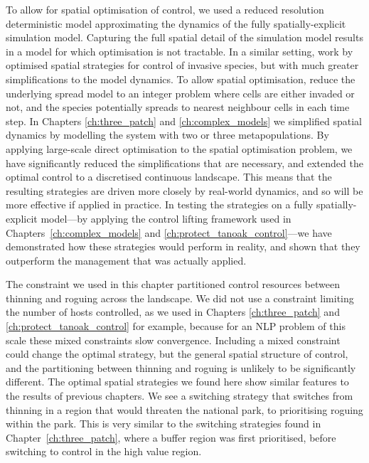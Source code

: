 To allow for spatial optimisation of control, we used a reduced resolution deterministic model approximating the dynamics of the fully spatially-explicit simulation model. Capturing the full spatial detail of the simulation model results in a model for which optimisation is not tractable. In a similar setting, work by \citet{epanchin_optimal_2012} optimised spatial strategies for control of invasive species, but with much greater simplifications to the model dynamics. To allow spatial optimisation, \citet{epanchin_optimal_2012} reduce the underlying spread model to an integer problem where cells are either invaded or not, and the species potentially spreads to nearest neighbour cells in each time step. In Chapters \ref{ch:three_patch} and \ref{ch:complex_models} we simplified spatial dynamics by modelling the system with two or three metapopulations. By applying large-scale direct optimisation to the spatial optimisation problem, we have significantly reduced the simplifications that are necessary, and extended the optimal control to a discretised continuous landscape. This means that the resulting strategies are driven more closely by real-world dynamics, and so will be more effective if applied in practice. In testing the strategies on a fully spatially-explicit model---by applying the control lifting framework used in Chapters~\ref{ch:complex_models} and \ref{ch:protect_tanoak_control}---we have demonstrated how these strategies would perform in reality, and shown that they outperform the management that was actually applied.

The constraint we used in this chapter partitioned control resources between thinning and roguing across the landscape. We did not use a constraint limiting the number of hosts controlled, as we used in Chapters \ref{ch:three_patch} and \ref{ch:protect_tanoak_control} for example, because for an NLP problem of this scale these mixed constraints slow convergence. Including a mixed constraint could change the optimal strategy, but the general spatial structure of control, and the partitioning between thinning and roguing is unlikely to be significantly different. The optimal spatial strategies we found here show similar features to the results of previous chapters. We see a switching strategy that switches from thinning in a region that would threaten the national park, to prioritising roguing within the park. This is very similar to the switching strategies found in Chapter~\ref{ch:three_patch}, where a buffer region was first prioritised, before switching to control in the high value region.

